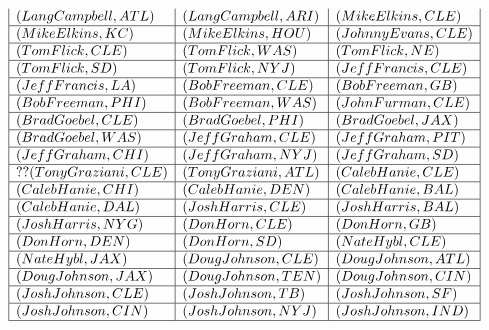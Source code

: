 \documentclass{ximera}
\begin{document}
\begin{center}
\[\begin{array}{|l|l|l|}
(Lang Campbell, ATL) & (Lang Campbell, ARI) & (Mike Elkins, CLE) \\\hline 


(Mike Elkins, KC) & (Mike Elkins, HOU) & (Johnny Evans, CLE) \\\hline 


(Tom Flick, CLE) & (Tom Flick, WAS) &  (Tom Flick, NE) \\\hline  


(Tom Flick, SD) & (Tom Flick, NYJ) & (Jeff Francis, CLE) \\\hline 


(Jeff Francis, LA) & (Bob Freeman, CLE) & (Bob Freeman, GB) \\\hline 


(Bob Freeman, PHI) & (Bob Freeman, WAS) & (John Furman, CLE) \\\hline 


(Brad Goebel, CLE) & (Brad Goebel, PHI) & (Brad Goebel, JAX) \\\hline 


(Brad Goebel, WAS) & (Jeff Graham, CLE) & (Jeff Graham, PIT) \\\hline 


(Jeff Graham, CHI) & (Jeff Graham, NYJ) & (Jeff Graham, SD) \\\hline ??

(Tony Graziani, CLE) & (Tony Graziani, ATL) & (Caleb Hanie, CLE) \\\hline 


(Caleb Hanie, CHI) & (Caleb Hanie, DEN) & (Caleb Hanie, BAL) \\\hline 


(Caleb Hanie, DAL) & (Josh Harris, CLE) & (Josh Harris, BAL) \\\hline 


(Josh Harris, NYG) & (Don Horn, CLE) & (Don Horn, GB) \\\hline 


(Don Horn, DEN) & (Don Horn, SD) & (Nate Hybl, CLE) \\\hline 


(Nate Hybl, JAX) & (Doug Johnson, CLE) & (Doug Johnson, ATL) \\\hline 


(Doug Johnson, JAX) & (Doug Johnson, TEN) & (Doug Johnson, CIN) \\\hline


(Josh Johnson, CLE) & (Josh Johnson, TB) & (Josh Johnson, SF) \\\hline 


(Josh Johnson, CIN) & (Josh Johnson, NYJ) & (Josh Johnson, IND) \\\hline 



\end{array}\]
\end{center}
\end{document}
